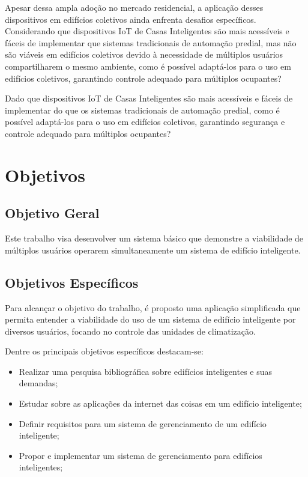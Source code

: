 Apesar dessa ampla adoção no mercado residencial, a aplicação desses dispositivos em edifícios coletivos ainda enfrenta desafios específicos.
Considerando que dispositivos IoT de Casas Inteligentes são mais acessíveis e fáceis de implementar que sistemas tradicionais de automação predial,
mas não são viáveis em edifícios coletivos devido à necessidade de múltiplos usuários compartilharem o mesmo ambiente, como é possível adaptá-los
para o uso em edifícios coletivos, garantindo controle adequado para múltiplos ocupantes?

Dado que dispositivos IoT de Casas Inteligentes são mais acessíveis e fáceis de implementar do que os sistemas tradicionais de automação predial, 
como é possível adaptá-los para o uso em edifícios coletivos, garantindo segurança e controle adequado para múltiplos ocupantes?


\section{Objetivos}
\subsection{Objetivo Geral}
Este trabalho visa desenvolver um sistema básico que demonstre a viabilidade de múltiplos usuários operarem simultaneamente 
um sistema de edifício inteligente.

\subsection{Objetivos Específicos}

Para alcançar o objetivo do trabalho, é proposto uma aplicação simplificada que permita entender a viabilidade do uso de um 
sistema de edifício inteligente por diversos usuários, focando no controle das unidades de climatização.

Dentre os principais objetivos específicos destacam-se:

\begin{itemize}
    \item Realizar uma pesquisa bibliográfica sobre edifícios inteligentes e suas demandas;
    \item Estudar sobre as aplicações da internet das coisas em um edifício inteligente;
    \item Definir requisitos para um sistema de gerenciamento de um edifício inteligente;
    \item Propor e implementar um sistema de gerenciamento para edifícios inteligentes;
\end{itemize}

